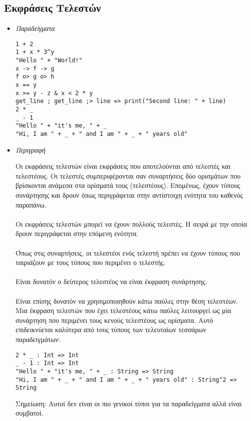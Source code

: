 \documentclass[diploma]{softlab-thesis}
\begin{document}
\newpage
\subsection{Εκφράσεις Τελεστών}

\begin{itemize}
\item \textit{Παραδείγματα}
\begin{verbatim}
1 + 2
1 + x * 3^y
"Hello " + "World!"
x -> f -> g
f o> g o> h
x == y
x >= y - z & x < 2 * y
get_line ; get_line ;> line => print("Second line: " + line)
2 * _
_ - 1
"Hello " + "it's me, " + _
"Hi, I am " + _ + " and I am " + _ + " years old"
\end{verbatim}

\item \textit{Περιγραφή}

Οι εκφράσεις τελεστών είναι εκφράσεις που αποτελούνται από τελεστές και
τελεστέους. Οι τελεστές συμπεριφέρονται σαν συναρτήσεις δύο ορισμάτων που
βρίσκονται ανάμεσα στα ορίσματά τους (τελεστέους). Επομένως, έχουν τύπους
συνάρτησης και δρουν όπως περιγράφεται στην αντίστοιχη ενότητα του
καθενός παραπάνω.
\\\\
Οι εκφράσεις τελεστών μπορεί να έχουν πολλούς τελεστές. H σειρά με την
οποία δρουν περιγράφεται στην επόμενη ενότητα.
\\\\
Όπως στις συναρτήσεις, οι τελεστέοι ενός τελεστή πρέπει να έχουν τύπους
που ταιριάζουν με τους τύπους που περιμένει ο τελεστής.
\\\\
Είναι δυνατόν ο δεύτερος τελεστέος να είναι έκφραση συνάρτησης.
\\\\
Είναι επίσης δυνατόν να χρησιμοποιηθούν κάτω παύλες στην θέση τελεστέων.
Μια έκφραση τελεστών που έχει τελεστέους κάτω παύλες λειτουργεί ως μία
συνάρτηση που περιμένει τους κενούς τελεστέους ως ορίσματα.
Αυτό επιδεικνύεται καλύτερα από τους τύπους των τελευταίων τεσσάρων
παραδειγμάτων:

\begin{verbatim}
2 * _ : Int => Int
_ - 1 : Int => Int
"Hello " + "it's me, " + _ : String => String
"Hi, I am " + _ + " and I am " + _ + " years old" : String^2 => String
\end{verbatim}
Σημείωση: Αυτοί δεν είναι οι πιο γενικοί τύποι για τα παραδείγματα αλλά είναι
συμβατοί.

\end{itemize}
\end{document}
